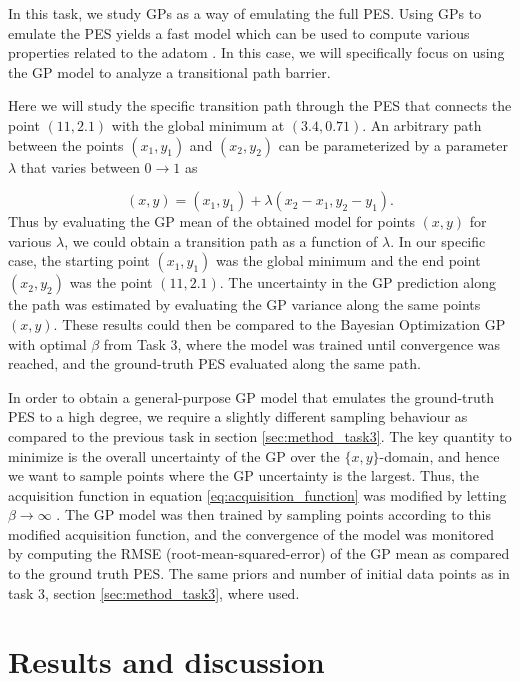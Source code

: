 \documentclass[11pt,a4paper]{article}
\begin{document}
In this task, we study GPs as a way of emulating the full PES. Using GPs to emulate the PES yields a fast model which can be used to compute various properties related to the adatom \cite{project_pm}. In this case, we will specifically focus on using the GP model to analyze a transitional path barrier. 

Here we will study the specific transition path through the PES that connects the point $(11,2.1)$ with the global minimum at $(3.4,0.71)$. An arbitrary path between the points $(x_1,y_1)$ and $(x_2,y_2)$ can be parameterized by a parameter $\lambda$ that varies between $0\rightarrow1$ as

\begin{equation}
    (x,y) = \left(x_1, y_1 \right ) + \lambda \left(x_2-x_1, y_2-y_1 \right).
\end{equation}
Thus by evaluating the GP mean of the obtained model for points $(x,y)$ for various $\lambda$, we could obtain a transition path as a function of $\lambda$. In our specific case, the starting point $(x_1,y_1)$ was the global minimum and the end point $(x_2,y_2)$ was the point $(11,2.1)$. The uncertainty in the GP prediction along the path was estimated by evaluating the GP variance along the same points $(x,y)$. These results could then be compared to the Bayesian Optimization GP with optimal $\beta$ from Task 3, where the model was trained until convergence was reached, and the ground-truth PES evaluated along the same path. 

In order to obtain a general-purpose GP model that emulates the ground-truth PES to a high degree, we require a slightly different sampling behaviour as compared to the previous task in section \ref{sec:method_task3}. The key quantity to minimize is the overall uncertainty of the GP over the $\{x,y\}$-domain, and hence we want to sample points where the GP uncertainty is the largest. Thus, the acquisition function in equation \eqref{eq:acquisition_function} was modified by letting $\beta \rightarrow \infty$ \cite{project_pm}. The GP model was then trained by sampling points according to this modified acquisition function, and the convergence of the model was monitored by computing the RMSE (root-mean-squared-error) of the GP mean as compared to the ground truth PES. The same priors and number of initial data points as in task 3, section \ref{sec:method_task3}, where used.








\section{Results and discussion}
\end{document}
